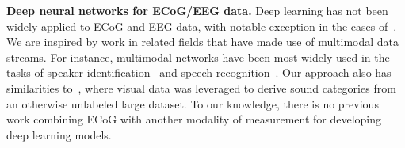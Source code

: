 \documentclass[letterpaper]{article} %
\begin{document}
\textbf{Deep neural networks for ECoG/EEG data.}
Deep learning has not been widely applied to ECoG and EEG data, with notable exception in the cases of~\cite{krug2008cnn,wang2013deep,nurse2016decoding,schirrmeister2017deep}.
We are inspired by work in related fields that have made use of multimodal data streams. 
For instance, multimodal networks have been most widely used in the tasks of speaker identification~\cite{ren2016look} and speech recognition~\cite{ngiam2011multimodal}.
Our approach also has similarities to~\cite{Aytar2016}, where visual data was leveraged to derive sound categories from an otherwise unlabeled large dataset.
To our knowledge, there is no previous work combining ECoG with another modality of measurement for developing deep learning models.

%
\end{document}
